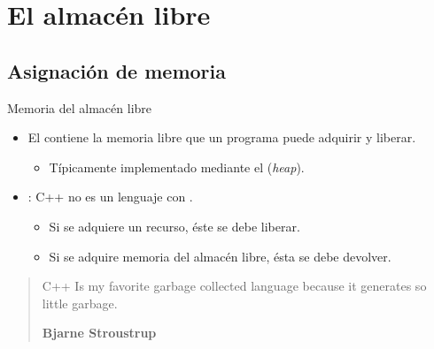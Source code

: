 \section{El almacén libre}

\subsection{Asignación de memoria}

\begin{frame}[t]{Memoria del almacén libre}
\begin{itemize}
  \item El  contiene la memoria libre que un programa
        puede adquirir y liberar.
    \begin{itemize}
      \item Típicamente implementado mediante el  (\emph{heap}).
    \end{itemize}

  \item {}: C++ no es un lenguaje con 
        .
    \begin{itemize}
      \item Si se adquiere un recurso, éste se debe liberar.
      \item Si se adquire memoria del almacén libre, ésta se debe devolver.
    \end{itemize}
\end{itemize}

\begin{quote}
C++ Is my favorite garbage collected language because it generates so little garbage.

\textbf{Bjarne Stroustrup}
\end{quote}
\end{frame}

